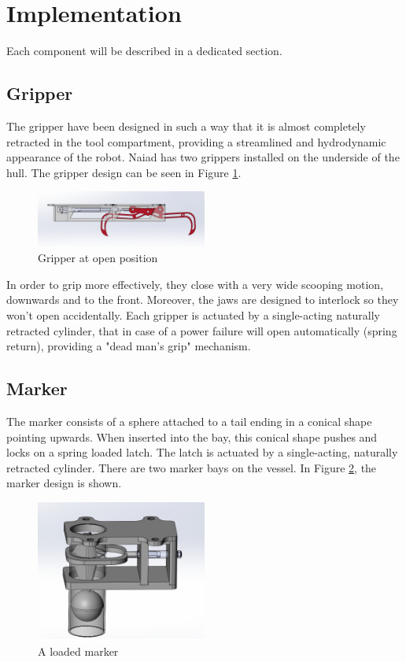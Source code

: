 \section{Implementation}\label{sec:implementation}
Each component will be described in a dedicated section.

\subsection{Gripper}
The gripper have been designed in such a way that it is almost completely retracted in the tool compartment, providing a streamlined and hydrodynamic appearance of the robot. Naiad has two grippers installed on the underside of the hull. The gripper design can be seen in Figure \ref{fig:gripper}.

\begin{figure}[t]
    \includegraphics[width=0.5\textwidth]{./figure/gripper_open.png}
    \caption{Gripper at open position}
    \label{fig:gripper}
\end{figure}

In order to grip more effectively, they close with a very wide scooping motion, downwards and to the front. Moreover, the jaws are designed to interlock so they won't open accidentally. Each gripper is actuated by a single-acting naturally retracted cylinder, that in case of a power failure will open automatically (spring return), providing a "dead man's grip" mechanism.

\subsection{Marker}
The marker consists of a sphere attached to a tail ending in a conical shape pointing upwards. When inserted into the bay, this conical shape pushes and locks on a spring loaded latch. The latch is actuated by a single-acting, naturally retracted cylinder. There are two marker bays on the vessel. In Figure \ref{fig:marker}, the marker design is shown.

\begin{figure}[h]
    \includegraphics[width=0.5\textwidth]{./figure/marker_loaded.png}
    \caption{A loaded marker}
    \label{fig:marker}
\end{figure}

